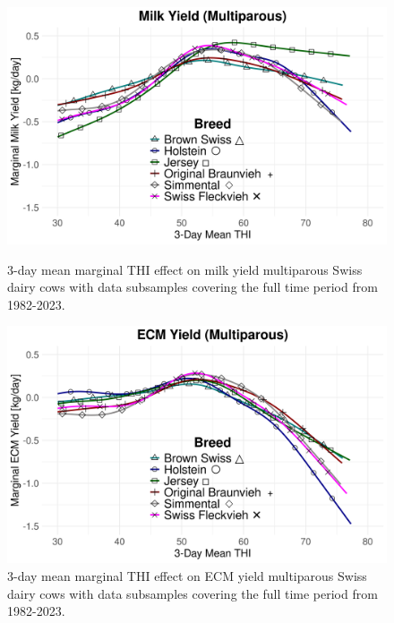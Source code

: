 \begin{figure}[H]
    \centering
    \begin{minipage}{0.49\textwidth}
        \centering
        \includegraphics[width=\textwidth]{thesis/figures/results/milk_multiparous_overlapped.png}
        \caption{3-day mean marginal THI effect on milk yield multiparous Swiss dairy cows with data subsamples covering the full time period from 1982-2023.}
        \label{fig:milk_marginal_combined}
    \end{minipage}
    \hfill
    \begin{minipage}{0.49\textwidth}
        \centering
        \includegraphics[width=\textwidth]{thesis/figures/results/ecm_multiparous_overlapped.png}
        \caption{3-day mean marginal THI effect on ECM yield multiparous Swiss dairy cows with data subsamples covering the full time period from 1982-2023.}
        \label{fig:ecm_marginal_combined}
    \end{minipage}
\end{figure}

